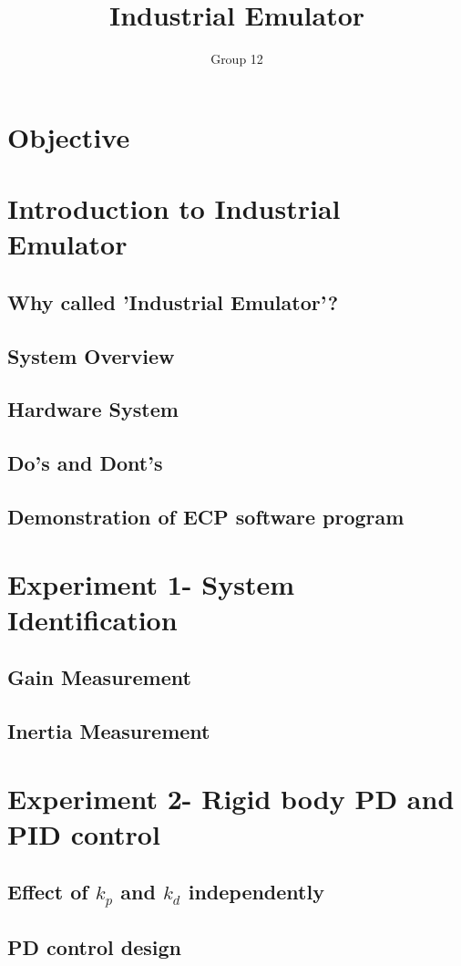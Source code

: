 \documentclass[11pt, a4paper]{article}
\title{\textbf{Industrial Emulator}}
\author{Group 12}
\begin{document}
\maketitle
\newpage
\tableofcontents
\newpage
\section{Objective}
\section{Introduction to Industrial Emulator}
\subsection{Why called 'Industrial Emulator'?}
\subsection{System Overview}
\subsection{Hardware System}
\subsection{Do's and Dont's}
\subsection{Demonstration of ECP software program}
\section{Experiment 1- System Identification}
\subsection{Gain Measurement}
\subsection{Inertia Measurement}
\section{Experiment 2- Rigid body PD and PID control}
\subsection{Effect of $k_p$ and $k_d$ independently}
\subsection{PD control design}
\end{document}
